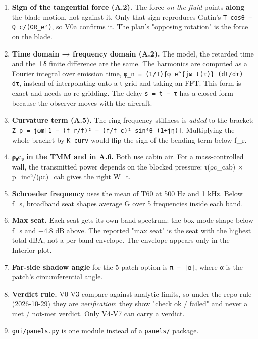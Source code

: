 \documentclass[10pt,a4paper]{article}
\begin{document}
\begin{enumerate}
\item \textbf{Sign of the tangential force (A.2).} The force \emph{on the fluid} points \textbf{along} the blade motion, not against it. Only that sign reproduces Gutin's \texttt{T cosθ − Q c/\allowbreak{}(ΩR\_\allowbreak{}e²)}, so V0a confirms it. The plan's "opposing rotation" is the force on the blade.
\item \textbf{Time domain → frequency domain (A.2).} The model, the retarded time and the ±δ finite difference are the same. The harmonics are computed as a Fourier integral over emission time, \texttt{φ\_\allowbreak{}n = (1/\allowbreak{}T)∫φ e\textasciicircum{}\{jω t(τ)\} (dt/\allowbreak{}dτ) dτ}, instead of interpolating onto a t grid and taking an FFT. This form is exact and needs no re-gridding. The delay \texttt{s = t − τ} has a closed form because the observer moves with the aircraft.
\item \textbf{Curvature term (A.5).} The ring-frequency stiffness is \emph{added} to the bracket: \texttt{Z\_\allowbreak{}p = jωm[1 − (f\_\allowbreak{}r/\allowbreak{}f)² − (f/\allowbreak{}f\_\allowbreak{}c)² sin⁴θ (1+jη)]}. Multiplying the whole bracket by \texttt{K\_\allowbreak{}curv} would flip the sign of the bending term below f\_r.
\item \textbf{ρ₀c₀ in the TMM and in A.6.} Both use cabin air. For a mass-controlled wall, the transmitted power depends on the blocked pressure: τ(ρc\_cab) × p\_inc²/(ρc)\_cab gives the right W\_t.
\item \textbf{Schroeder frequency} uses the mean of T60 at 500 Hz and 1 kHz. Below f\_s, broadband seat shapes average G over 5 frequencies inside each band.
\item \textbf{Max seat.} Each seat gets its own band spectrum: the box-mode shape below f\_s and +4.8 dB above. The reported "max seat" is the seat with the highest total dBA, not a per-band envelope. The envelope appears only in the Interior plot.
\item \textbf{Far-side shadow angle} for the 5-patch option is \texttt{π − |α|}, where α is the patch's circumferential angle.
\item \textbf{Verdict rule.} V0-V3 compare against analytic limits, so under the repo rule (2026-10-29) they are \emph{verification}: they show "check ok / failed" and never a met / not-met verdict. Only V4-V7 can carry a verdict.
\item \texttt{gui/\allowbreak{}panels.\allowbreak{}py} is one module instead of a \texttt{panels/\allowbreak{}} package.
\end{enumerate}
\end{document}
